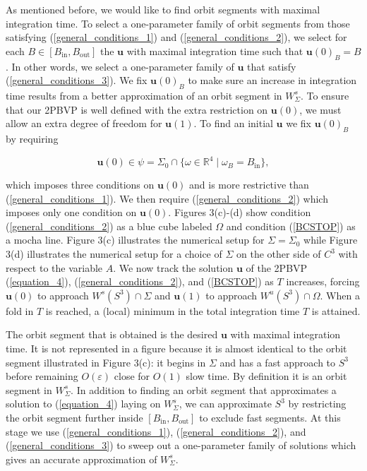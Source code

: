 \documentclass{ws-ijbc}
\begin{document}
As mentioned before, we would like to find orbit segments with maximal integration time.  To select a one-parameter family of orbit segments from those satisfying (\ref{general_conditions_1}) and (\ref{general_conditions_2}), we select for each $B \in [B_{\text{in}}, B_{\text{out}}]$ the $\mathbf{u}$ with maximal integration time such that $\mathbf{u}(0)_B=B$.  In other words, we select a one-parameter family of $\mathbf{u}$ that satisfy (\ref{general_conditions_3}).  We fix $\mathbf{u}(0)_B$ to make sure an increase in integration time results from a better approximation of an orbit segment in $W^s_\Sigma$.  To ensure that our 2PBVP is well defined with the extra restriction on $\mathbf{u}(0)$, we must allow an extra degree of freedom for $\mathbf{u}(1)$. To find an initial $\mathbf{u}$ we fix $\mathbf{u}(0)_B$ by requiring
    
\begin{equation}
	\mathbf{u}(0) \in \psi=\Sigma_{0} \cap \{ \omega \in \mathbb{R}^4 \; | \; \omega_B = B_{\text{in}} \},
	\label{BCSTOP}
\end{equation}
    
\noindent
which imposes three conditions on $\mathbf{u}(0)$ and is more restrictive than (\ref{general_conditions_1}).  We then require (\ref{general_conditions_2}) which imposes only one condition on $\mathbf{u}(0)$.  Figures 3(c)-(d) show condition (\ref{general_conditions_2}) as a blue cube labeled $\Omega$ and condition (\ref{BCSTOP}) as a mocha line.  Figure 3(c) illustrates the numerical setup for $\Sigma=\Sigma_0$ while Figure 3(d) illustrates the numerical setup for a choice of $\Sigma$ on the other side of $C^3$ with respect to the variable $A$.  We now track the solution $\mathbf{u}$ of the 2PBVP (\ref{equation_4}), (\ref{general_conditions_2}), and (\ref{BCSTOP}) as $T$ increases, forcing $\mathbf{u}(0)$ to approach $W^s(S^3)\cap\Sigma$ and $\mathbf{u}(1)$ to approach $W^u(S^3) \cap \Omega$. When a fold in $T$ is reached, a (local) minimum in the total integration time $T$ is attained.

The orbit segment that is obtained is the desired $\mathbf{u}$ with maximal integration time.  It is not represented in a figure because it is almost identical to the orbit segment illustrated in Figure 3(c): it begins in $\Sigma$ and has a fast approach to $S^3$ before remaining $O(\varepsilon)$ close for $O(1)$ slow time.  By definition it is an orbit segment in $W^{s}_{\Sigma}$.  In addition to finding an orbit segment that approximates a solution to (\ref{equation_4}) laying on $W^s_{\Sigma}$, we can approximate $S^3$ by restricting the orbit segment further inside $[B_{\text{in}},B_{\text{out}}]$ to exclude fast segments. At this stage we use (\ref{general_conditions_1}), (\ref{general_conditions_2}), and (\ref{general_conditions_3}) to sweep out a one-parameter family of solutions which gives an accurate approximation of $W^s_\Sigma$.
\end{document}
